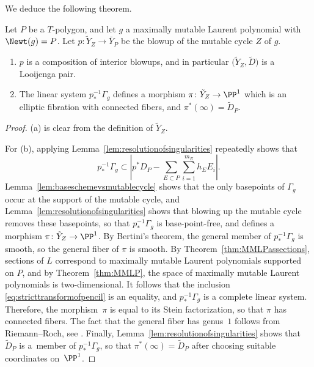 We deduce the following theorem.
\begin{Theorem}
	Let $P$ be a $T$-polygon, and let $g$ a maximally mutable Laurent polynomial with~${\Newt(g)=P}$. Let $p \colon \tilde{Y}_Z \rightarrow \bar{Y}_P$ be the blowup of the mutable cycle $Z$ of $g$.
	\begin{enumerate}[$(a)$]\itemsep=0pt
	\item $p$ is a composition of interior blowups, and in particular $\bigl(\tilde{Y}_Z, \tilde{D}\bigr)$ is a Looijenga pair.
	\item The linear system $p_*^{-1}\Gamma_g$ defines a morphism $\pi \colon \tilde{Y}_Z \rightarrow \PP^1$ which is an elliptic fibration with connected fibers, and $\pi^*(\infty)=\tilde{D}_P$.
	\end{enumerate}
\end{Theorem}
\begin{proof}
	(a) is clear from the definition of $\tilde{Y}_Z$.

	For (b), applying Lemma~\ref{lem:resolutionofsingularities} repeatedly shows that
	\begin{equation}\label{eq:stricttransformofpencil}
	p_*^{-1}\Gamma_g \subset 	\left|p^*D_P-\sum_{E \subset P}\sum_{i=1}^{m_E} h_E E_i\right|.
	\end{equation}
	Lemma~\ref{lem:baseschemevsmutablecycle} shows that the only basepoints of $\Gamma_g$ occur at the support of the mutable cycle, and Lemma~\ref{lem:resolutionofsingularities} shows that blowing up the mutable cycle removes these basepoints, so that $p_*^{-1}\Gamma_g$ is base-point-free, and defines a morphism $\pi \colon \tilde{Y}_Z \rightarrow \PP^1$. By Bertini's theorem, the general member of $p_*^{-1}\Gamma_g$ is smooth, so the general fiber of $\pi$ is smooth. By Theorem~\ref{thm:MMLPassections}, sections of $L$ correspond to maximally mutable Laurent polynomials supported on $P$, and by Theorem~\ref{thm:MMLP}, the space of maximally mutable Laurent polynomials is two-dimensional. It follows that the inclusion \eqref{eq:stricttransformofpencil} is an equality, and $p_*^{-1}\Gamma_g$ is a complete linear system. Therefore, the morphism~$\pi$ is equal to its Stein factorization, so that $\pi$ has connected fibers. The fact that the general fiber has genus~$1$ follows from Riemann--Roch, see \cite[Theorem 3.5]{Tveiten}. Finally, Lemma~\ref{lem:resolutionofsingularities} shows that~$\tilde{D}_P$ is a~member of $p_*^{-1}\Gamma_g$, so that $\pi^*(\infty)=\tilde{D}_P$ after choosing suitable coordinates on~$\PP^1$.
\end{proof}
